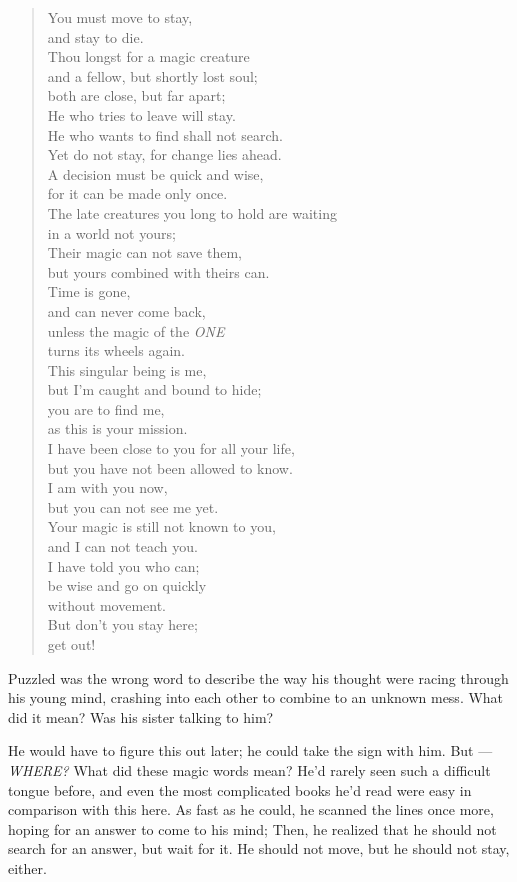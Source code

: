 \begin{quote}
You must move to stay,\\
and stay to die.\\
Thou longst for a magic creature\\
and a fellow, but shortly lost soul;\\
both are close, but far apart;\\
He who tries to leave will stay.\\
He who wants to find shall not search.\\
Yet do not stay, for change lies ahead.\\
A decision must be quick and wise,\\
for it can be made only once.\\
The late creatures you long to hold are waiting\\
in a world not yours;\\
Their magic can not save them,\\
but yours combined with theirs can.\\
Time is gone,\\
and can never come back,\\
unless the magic of the \emph{ONE}\\
turns its wheels again.\\
This singular being is me,\\
but I'm caught and bound to hide;\\
you are to find me,\\
as this is your mission.\\
I have been close to you for all your life,\\
but you have not been allowed to know.\\
I am with you now,\\
but you can not see me yet.\\
Your magic is still not known to you,\\
and I can not teach you.\\
I have told you who can;\\
be wise and go on quickly\\
without movement.\\
But don't you stay here;\\
get out!
\end{quote}
Puzzled was the wrong word to describe the way his thought were racing through his young mind, crashing into each other to combine to an unknown mess. 
What did it mean? Was his sister talking to him?

He would have to figure this out later; he could take the sign with him. But --- \emph{WHERE?} 
What did these magic words mean? He'd rarely seen such a difficult tongue before, and even the most complicated books he'd read were easy in comparison with this here. 
As fast as he could, he scanned the lines once more, hoping for an answer to come to his mind; Then, he realized that he should not search for an answer, but wait for it. 
He should not move, but he should not stay, either.

